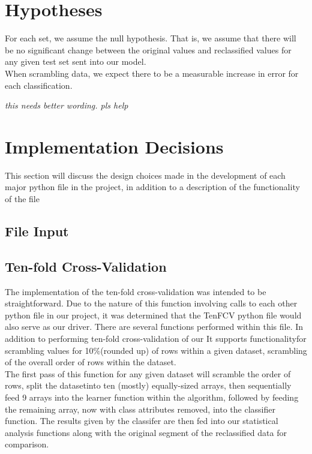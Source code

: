 \documentclass[twoside,11pt]{article}
\begin{document}
\section{Hypotheses}

For each set, we assume the null hypothesis. That is, we assume that there will be no 
significant change between the original values and reclassified values for any given test
set sent into our model.\\

When scrambling data, we expect there to be a measurable increase in error for each classification.

\emph{this needs better wording. pls help}\\
\section{Implementation Decisions}

This section will discuss the design choices made in the development of each major 
python file in the project, in addition to a description of the functionality of 
the file

\subsection{File Input}

\subsection{Ten-fold Cross-Validation}

The implementation of the ten-fold cross-validation was intended to be straightforward. 
Due to the nature of this function involving calls to each other python file in our 
project, it was determined that the TenFCV python file would also serve as our driver. 
There are several functions performed within this file. In addition to performing 
ten-fold cross-validation of our It supports functionalityfor scrambling values for 
10\%(rounded up) of rows within a given dataset, scrambling of the overall order of 
rows within the dataset.\\
The first pass of this function for any given dataset will scramble the order of rows, 
split the datasetinto ten (mostly) equally-sized arrays, then sequentially feed 9 arrays 
into the learner function within the algorithm, followed by feeding the remaining array, 
now with class attributes removed, into the classifier function. The results given by 
the classifer are then fed into our statistical analysis functions along with the original 
segment of the reclassified data for comparison.
\end{document}
